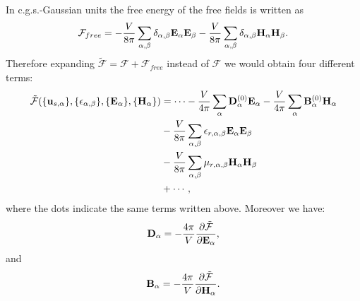 \documentclass[12pt,a4paper,twoside]{report}
\begin{document}
{\color{orange} In c.g.s.-Gaussian units the free energy of the 
free fields is written as
\begin{equation}
\mathcal{F}_{free}=-{V \over 8 \pi} \sum_{\alpha,\beta} 
\delta_{\alpha,\beta} {\bf E}_\alpha {\bf E}_\beta-
{V \over 8 \pi} \sum_{\alpha,\beta} 
\delta_{\alpha,\beta} {\bf H}_\alpha {\bf H}_\beta.
\end{equation}
Therefore expanding $\mathcal{\tilde F} = \mathcal{F} + \mathcal{F}_{free}$
instead of $\mathcal{F}$ we would obtain four different terms:
\begin{align}
\mathcal{\tilde F}(\{{\bf u}_{s,\alpha}\}, \{\epsilon_{\alpha,\beta}\},
\{ {\bf E}_\alpha\}, \{{\bf H}_\alpha\})&= \cdots -
{V\over 4 \pi} \sum_{\alpha} {\bf D}^{(0)}_\alpha {\bf E}_\alpha - 
{V \over 4 \pi} \sum_{\alpha} {\bf B}^{(0)}_\alpha {\bf H}_\alpha \nonumber \\
&- {V\over 8 \pi} \sum_{\alpha,\beta} 
\epsilon_{r,\alpha,\beta}
{\bf E}_{\alpha}
{\bf E}_{\beta} \nonumber \\
&- {V\over 8 \pi} \sum_{\alpha,\beta} 
\mu_{r,\alpha,\beta}
{\bf H}_{\alpha}
{\bf H}_{\beta} \nonumber \\
&+ \cdots,
\end{align}
where the dots indicate the same terms written above.
Moreover we have:
\begin{equation}
{\bf D}_\alpha = -{4 \pi \over V} {\partial \mathcal{\tilde F} \over 
\partial {\bf E}_\alpha},
\end{equation}
and
\begin{equation}
{\bf B}_\alpha = -{4 \pi \over V} {\partial \mathcal{\tilde F} \over 
\partial {\bf H}_\alpha}.
\end{equation}
}
\end{document}
